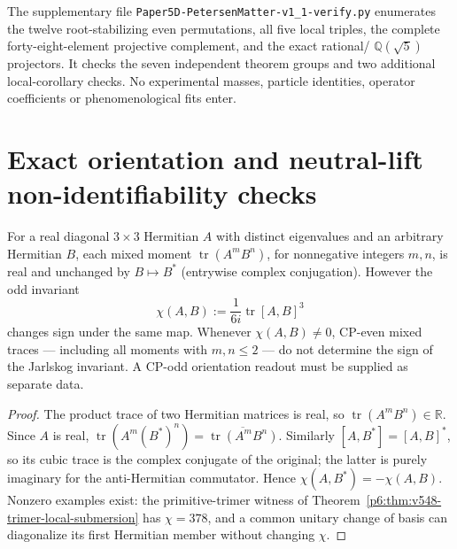 \documentclass[11pt,a4paper]{article}
\begin{document}
\begin{remark}
\leavevmode\par\noindent
The supplementary file
\texttt{Paper5D-\allowbreak PetersenMatter-\allowbreak v1\_1-\allowbreak verify.py} enumerates the twelve
root-stabilizing even permutations, all five local triples, the complete
forty-eight-element projective complement, and the exact rational/
$\mathbb Q(\sqrt5)$ projectors. It checks the seven independent theorem
groups and two additional local-corollary checks. No experimental masses,
particle identities, operator coefficients or phenomenological fits enter.
\end{remark}



\clearpage
\section{Exact orientation and neutral-lift non-identifiability checks}
\label{p5d:sec:v348-information-boundaries}
\begin{proposition}
\label{p5d:prop:v348-mixed-moments-cp-sign-nogo}
For a real diagonal $3\times3$ Hermitian $A$ with distinct
eigenvalues and an arbitrary Hermitian $B$, each mixed moment
$\operatorname{tr}(A^mB^n)$, for nonnegative integers $m,n$,
is real and unchanged by $B\mapsto B^*$ (entrywise complex
conjugation).  However the odd invariant
\[
 \chi(A,B):=\frac1{6i}\operatorname{tr}[A,B]^3
\]
changes sign under the same map.  Whenever $\chi(A,B)\ne0$,
CP-even mixed traces --- including all moments with $m,n\le2$ ---
do not determine the sign of the Jarlskog invariant.  A CP-odd
orientation readout must be supplied as separate data.
\end{proposition}
\begin{proof}
The product trace of two Hermitian matrices is real, so
$\operatorname{tr}(A^mB^n)\in\mathbb R$.  Since $A$ is real,
$\operatorname{tr}(A^m(B^*)^n)
=\overline{\operatorname{tr}(A^mB^n)}$.
Similarly $[A,B^*]=[A,B]^*$, so its cubic trace is the complex
conjugate of the original; the latter is purely imaginary for the
anti-Hermitian commutator.  Hence $\chi(A,B^*)=-\chi(A,B)$.
Nonzero examples exist: the primitive-trimer witness of
Theorem~\ref{p6:thm:v548-trimer-local-submersion} has $\chi=378$,
and a common unitary change of basis can diagonalize its first
Hermitian member without changing $\chi$.
\end{proof}
\end{document}
